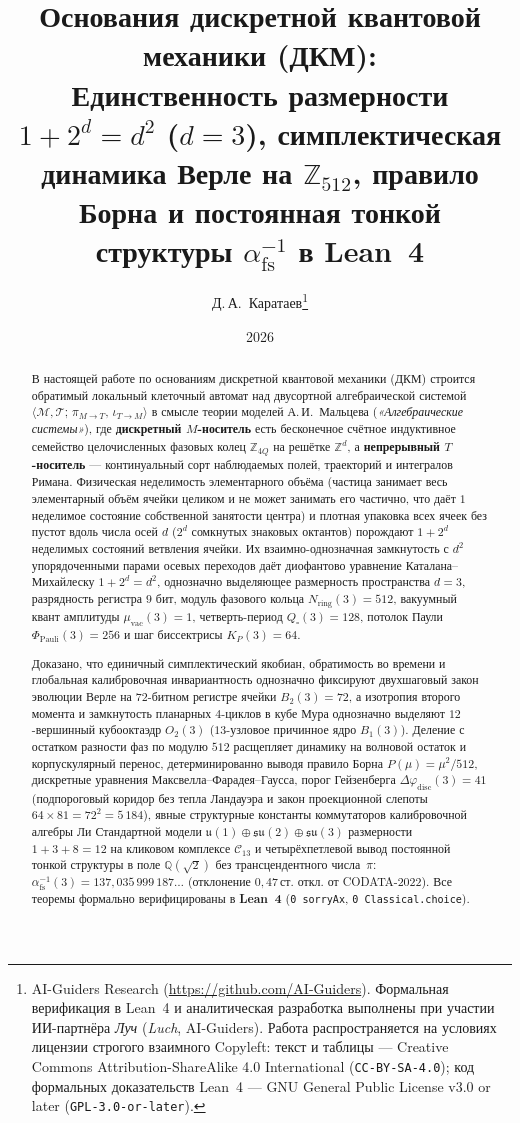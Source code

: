 \documentclass[11pt,a4paper]{article}
\title{\textbf{Основания дискретной квантовой механики (ДКМ):\\ Единственность размерности $1 + 2^d = d^2$ ($d = 3$), симплектическая динамика Верле на $\mathbb{Z}_{512}$, правило Борна и постоянная тонкой структуры $\alpha_{\mathrm{fs}}^{-1}$ в Lean~4}}
\author{Д.\,А.~Каратаев\thanks{AI-Guiders Research (\url{https://github.com/AI-Guiders}). Формальная верификация в Lean~4 и аналитическая разработка выполнены при участии ИИ-партнёра \emph{Луч} (\emph{Luch}, AI-Guiders). Работа распространяется на условиях лицензии строгого взаимного Copyleft: текст и таблицы --- Creative Commons Attribution-ShareAlike 4.0 International (\texttt{CC-BY-SA-4.0}); код формальных доказательств Lean~4 --- GNU General Public License v3.0 or later (\texttt{GPL-3.0-or-later}).}}
\date{2026}
\theoremstyle{plain}
\theoremstyle{definition}
\begin{document}
\maketitle

\begin{abstract}
В настоящей работе по основаниям дискретной квантовой механики (ДКМ) строится обратимый локальный клеточный автомат над двусортной алгебраической системой $\langle\mathcal{M},\mathcal{T};\,\pi_{M\to T},\,\iota_{T\to M}\rangle$ в смысле теории моделей А.\,И.~Мальцева (\emph{«Алгебраические системы»}), где \textbf{дискретный $M$-носитель} есть бесконечное счётное индуктивное семейство целочисленных фазовых колец $\mathbb{Z}_{4Q}$ на решётке $\mathbb{Z}^d$, а \textbf{непрерывный $T$-носитель} --- континуальный сорт наблюдаемых полей, траекторий и интегралов Римана. Физическая неделимость элементарного объёма (частица занимает весь элементарный объём ячейки целиком и не может занимать его частично, что даёт $1$ неделимое состояние собственной занятости центра) и плотная упаковка всех ячеек без пустот вдоль числа осей $d$ ($2^d$ сомкнутых знаковых октантов) порождают $1 + 2^d$ неделимых состояний ветвления ячейки. Их взаимно-однозначная замкнутость с $d^2$ упорядоченными парами осевых переходов даёт диофантово уравнение Каталана--Михайлеску $1 + 2^d = d^2$, однозначно выделяющее размерность пространства $d = 3$, разрядность регистра $9$ бит, модуль фазового кольца $N_{\mathrm{ring}}(3) = 512$, вакуумный квант амплитуды $\mu_{\mathrm{vac}}(3) = 1$, четверть-период $Q_\square(3) = 128$, потолок Паули $\Phi_{\mathrm{Pauli}}(3) = 256$ и шаг биссектрисы $K_P(3) = 64$.

Доказано, что единичный симплектический якобиан, обратимость во времени и глобальная калибровочная инвариантность однозначно фиксируют двухшаговый закон эволюции Верле на $72$-битном регистре ячейки $B_2(3) = 72$, а изотропия второго момента и замкнутость планарных $4$-циклов в кубе Мура однозначно выделяют $12$-вершинный кубооктаэдр $O_2(3)$ ($13$-узловое причинное ядро $B_1(3)$). Деление с остатком разности фаз по модулю $512$ расщепляет динамику на волновой остаток и корпускулярный перенос, детерминированно выводя правило Борна $P(\mu) = \mu^2/512$, дискретные уравнения Максвелла--Фарадея--Гаусса, порог Гейзенберга $\Delta\varphi_{\mathrm{disc}}(3) = 41$ (подпороговый коридор без тепла Ландауэра и закон проекционной слепоты $64\times 81 = 72^2 = 5\,184$), явные структурные константы коммутаторов калибровочной алгебры Ли Стандартной модели $\mathfrak{u}(1)\oplus\mathfrak{su}(2)\oplus\mathfrak{su}(3)$ размерности $1 + 3 + 8 = 12$ на кликовом комплексе $\mathcal{C}_{13}$ и четырёхпетлевой вывод постоянной тонкой структуры в поле $\mathbb{Q}(\sqrt{2})$ без трансцендентного числа~$\pi$: $\alpha_{\mathrm{fs}}^{-1}(3) = 137{,}035\,999\,187\dots$ (отклонение $0{,}47\,\text{ст.\ откл.}$ от CODATA-2022). Все теоремы формально верифицированы в \textbf{Lean~4} (\texttt{0 sorryAx}, \texttt{0 Classical.choice}).
\end{abstract}
\end{document}
